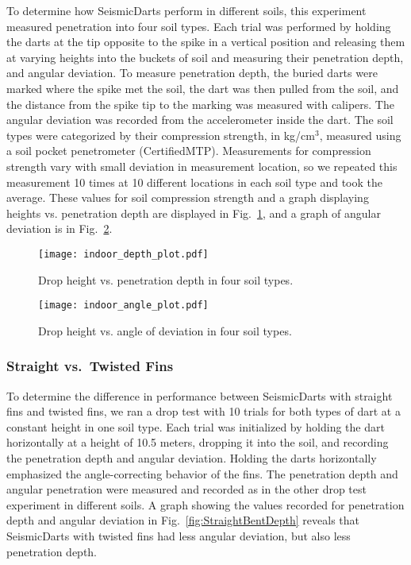 To determine how SeismicDarts perform in different soils, this experiment measured penetration into four soil types. Each trial was performed by holding the darts at the tip opposite to the spike in a vertical position and releasing them at varying heights into the buckets of soil and measuring their penetration depth, and angular deviation. To measure penetration depth, the buried darts were marked where the spike met the soil, the dart was then pulled from the soil, and the distance from the spike tip to the marking was measured with calipers. The angular deviation was recorded from the accelerometer inside the dart. The soil types were categorized by their compression strength, in kg/cm$^3$, measured using a soil pocket penetrometer (CertifiedMTP). Measurements for compression strength vary with small deviation in measurement location, so we repeated this measurement 10 times at 10 different locations in each soil type and took the average. These values for soil compression strength and a graph displaying heights vs. penetration depth are displayed in Fig.~\ref{fig:DepthPlotIndoors}, and a graph of angular deviation is in Fig.~\ref{fig:AnglePlotIndoors}. 


\begin{figure} \centering
{\texttt{[image: indoor\_depth\_plot.pdf]}}
\caption{Drop height vs. penetration depth in four soil types.} 
\label{fig:DepthPlotIndoors}
\end{figure}
\vspace{-1em}
\begin{figure} \centering
{\texttt{[image: indoor\_angle\_plot.pdf]}}
\caption{Drop height vs. angle of deviation in four soil types.} 
\label{fig:AnglePlotIndoors}
\vspace{-1em}
\end{figure}
\vspace{-1em}
\subsubsection{Straight vs.\ Twisted Fins}

To determine the difference in performance between SeismicDarts with straight fins and twisted fins, we ran a drop test with 10 trials for both types of dart at a constant height in one soil type. Each trial was initialized by holding the dart horizontally at a height of 10.5 meters, dropping it into the soil, and recording the penetration depth and angular deviation. Holding the darts horizontally emphasized the angle-correcting behavior of the fins. The penetration depth and angular penetration were measured and recorded as in the other drop test experiment in different soils. A graph showing the values recorded for penetration depth and angular deviation in Fig.~\ref{fig:StraightBentDepth}  reveals that SeismicDarts with twisted fins had less angular deviation, but also less penetration depth. 


